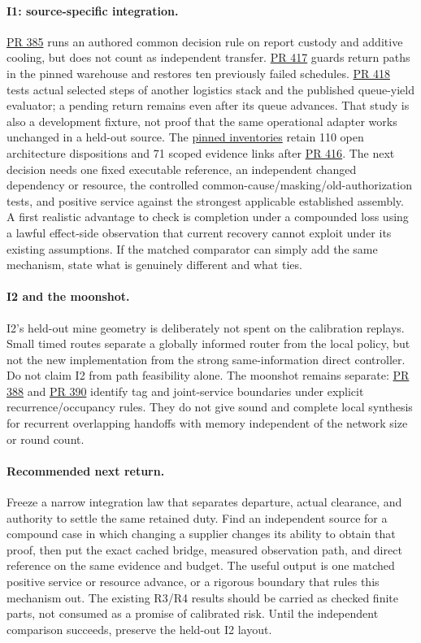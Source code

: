 \documentclass[11pt]{article}
\newcommand{\pr}[1]{\href{https://github.com/eternal-november/eos-research-programmes/pull/#1}{PR #1}}
\begin{document}
\paragraph{I1: source-specific integration.}
\pr{385} runs an authored common decision rule on report custody and additive cooling, but does not count as independent transfer. \pr{417} guards return paths in the pinned warehouse and restores ten previously failed schedules. \pr{418} tests actual selected steps of another logistics stack and the published queue-yield evaluator; a pending return remains even after its queue advances. That study is also a development fixture, not proof that the same operational adapter works unchanged in a held-out source. The \href{https://github.com/eternal-november/eos-research-programmes/blob/494f47c75110c6a48cd966401d9cf84a5a3d3b04/projects/swarm-coordination/fault-inventory/evaluation/README.md}{pinned inventories} retain 110 open architecture dispositions and 71 scoped evidence links after \pr{416}. The next decision needs one fixed executable reference, an independent changed dependency or resource, the controlled common-cause/masking/old-authorization tests, and positive service against the strongest applicable established assembly. A first realistic advantage to check is completion under a compounded loss using a lawful effect-side observation that current recovery cannot exploit under its existing assumptions. If the matched comparator can simply add the same mechanism, state what is genuinely different and what ties.

\paragraph{I2 and the moonshot.}
I2's held-out mine geometry is deliberately not spent on the calibration replays. Small timed routes separate a globally informed router from the local policy, but not the new implementation from the strong same-information direct controller. Do not claim I2 from path feasibility alone. The moonshot remains separate: \pr{388} and \pr{390} identify tag and joint-service boundaries under explicit recurrence/occupancy rules. They do not give sound and complete local synthesis for recurrent overlapping handoffs with memory independent of the network size or round count.

\paragraph{Recommended next return.}
Freeze a narrow integration law that separates departure, actual clearance, and authority to settle the same retained duty. Find an independent source for a compound case in which changing a supplier changes its ability to obtain that proof, then put the exact cached bridge, measured observation path, and direct reference on the same evidence and budget. The useful output is one matched positive service or resource advance, or a rigorous boundary that rules this mechanism out. The existing R3/R4 results should be carried as checked finite parts, not consumed as a promise of calibrated risk. Until the independent comparison succeeds, preserve the held-out I2 layout.
\end{document}
